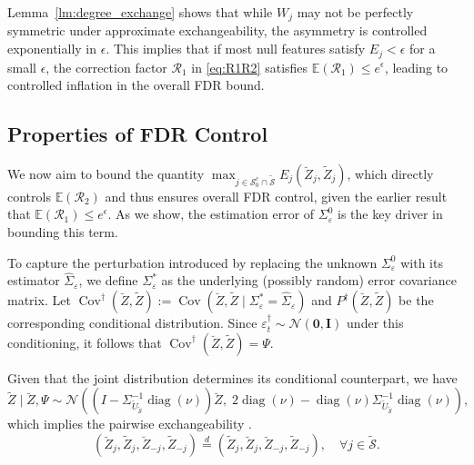 ﻿\documentclass[12pt]{article}
\newcommand{\0}{\mbox{\bf 0}}
\newcommand{\wj}[1]{\textcolor{blue}{#1 (Jie)}}
\theoremstyle{plain}%
\theoremstyle{definition}
\DeclareMathOperator{\diag}{diag}
\DeclareMathOperator{\Cov}{Cov}
\begin{document}
{%

Lemma~\ref{lm:degree_exchange} shows that while $W_j$ may not be perfectly symmetric under approximate exchangeability, the asymmetry is controlled exponentially in $\epsilon$. This implies that if most null features satisfy $E_j < \epsilon$ for a small $\epsilon$, the correction factor $\mathcal{R}_1$ in \eqref{eq:R1R2} satisfies $\mathbb{E}(\mathcal{R}_1) \leq  e^{\epsilon}$, leading to controlled inflation in the overall FDR bound.  %




\subsection{Properties of FDR Control}

We now aim to bound the quantity $\max_{j\in \mathcal{S}_{0}^{c} \cap \widetilde{\mathcal{S}}} E_{j}(\breve{Z}_{j},\widetilde{Z}_{j})$, which directly controls $\mathbb{E}(\mathcal{R}_2)$ and thus ensures overall FDR control, given the earlier result that $\mathbb{E}(\mathcal{R}_1) \leq  e^{\epsilon}$. As we show, the estimation error of $\Sigma_{\varepsilon}^{0}$ is the key driver in bounding this term.

To capture the perturbation introduced by replacing the unknown $\Sigma_{\varepsilon}^0$ with its estimator $\widehat{\Sigma}_{\varepsilon}$, we define $\Sigma_{\varepsilon}^\ast$ as the underlying (possibly random) error covariance matrix. Let $\Cov^{\dagger}(\breve{Z},\widetilde{Z}) := \Cov(\breve{Z},\widetilde{Z} \mid \Sigma_{\varepsilon}^{\ast} = \widehat{\Sigma}_{\varepsilon})$ and $P^{\dagger}(\breve{Z},\widetilde{Z})$ be the corresponding conditional distribution. Since $\varepsilon_t^{\dagger} \sim \mathcal{N}(\mathbf{0}, \mathbf{I})$ under this conditioning, it follows that $\Cov^{\dagger}(\breve{Z},\widetilde{Z}) = \Psi$.


Given that the joint distribution determines its conditional counterpart, we have
\begin{equation*}
\widetilde{Z} \mid \breve{Z}, \Psi \sim \mathcal{N} \left( \left(I - \Sigma_{\breve{U}_{\widetilde{\mathcal{S}}}}^{-1} \diag(\nu) \right) \breve{Z},\; 2\diag(\nu) - \diag(\nu)\Sigma_{\breve{U}_{\widetilde{\mathcal{S}}}}^{-1}\diag(\nu) \right),
\end{equation*}
which implies the pairwise exchangeability \citep[e.g., Lemma 4 in][]{BarberCandesSamworth2020}. 
\begin{equation}
(\breve{Z}_j, \widetilde{Z}_j, \breve{Z}_{-j}, \widetilde{Z}_{-j}) \overset{d}{=} (\widetilde{Z}_j, \breve{Z}_j, \breve{Z}_{-j}, \widetilde{Z}_{-j}), \quad \forall j \in \widetilde{\mathcal{S}}.
\label{eq:pair_exchange}
\end{equation}

}
\end{document}

